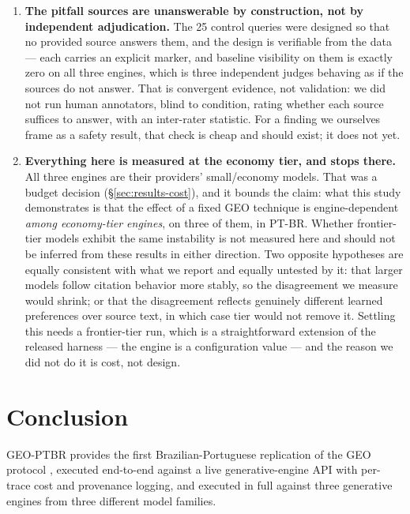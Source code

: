 \documentclass[11pt,a4paper]{article}
\begin{document}
\begin{enumerate}[leftmargin=*]
\item \textbf{The pitfall sources are unanswerable by construction, not by
  independent adjudication.} The 25 control queries were designed so that no
  provided source answers them, and the design is verifiable from the data
  --- each carries an explicit marker, and baseline visibility on them is
  exactly zero on all three engines, which is three independent judges
  behaving as if the sources do not answer. That is convergent evidence, not
  validation: we did not run human annotators, blind to condition, rating
  whether each source suffices to answer, with an inter-rater statistic. For
  a finding we ourselves frame as a safety result, that check is cheap and
  should exist; it does not yet.

\item \textbf{Everything here is measured at the economy tier, and stops
  there.} All three engines are their providers' small/economy models. That
  was a budget decision (\S\ref{sec:results-cost}), and it bounds the claim:
  what this study demonstrates is that the effect of a fixed GEO technique
  is engine-dependent \emph{among economy-tier engines}, on three of them,
  in PT-BR. Whether frontier-tier models exhibit the same instability is not
  measured here and should not be inferred from these results in either
  direction. Two opposite hypotheses are equally consistent with what we
  report and equally untested by it: that larger models follow citation
  behavior more stably, so the disagreement we measure would shrink; or that
  the disagreement reflects genuinely different learned preferences over
  source text, in which case tier would not remove it. Settling this needs a
  frontier-tier run, which is a straightforward extension of the released
  harness --- the engine is a configuration value --- and the reason we did
  not do it is cost, not design.

\end{enumerate}

\section{Conclusion}

GEO-PTBR provides the first Brazilian-Portuguese replication of the GEO
protocol \citep{aggarwal2024geo}, executed end-to-end against a live
generative-engine API with per-trace cost and provenance logging, and
executed in full against three generative engines from three different
model families.
\end{document}
